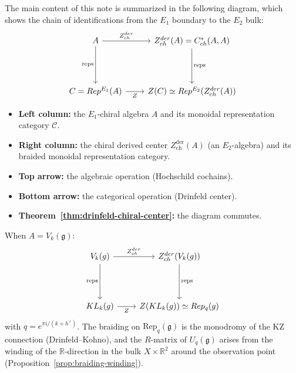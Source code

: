 \documentclass[11pt]{article}
\theoremstyle{definition}
\theoremstyle{remark}
\newcommand{\Rep}{\mathrm{Rep}}
\newcommand{\Uq}{U_q}
\newcommand{\cC}{\mathcal{C}}
\newcommand{\cZ}{\mathcal{Z}}
\newcommand{\frakg}{\mathfrak{g}}
\newcommand{\KL}{\mathrm{KL}}
\newcommand{\Zder}{Z^{\mathrm{der}}_{\mathrm{ch}}}
\begin{document}
The main content of this note is summarized in the following diagram, which shows the chain of identifications from the $E_1$ boundary to the $E_2$ bulk:
\[
\begin{tikzcd}[row sep=1.5cm, column sep=0.8cm]
 A \ar[d, "\text{reps}"'] \ar[r, "\Zder"] &
 \Zder(A) = C^*_{\mathrm{ch}}(A,A) \ar[d, "\text{reps}"] \\
 \cC = \Rep^{E_1}(A) \ar[r, "\cZ"'] &
 \cZ(\cC) \simeq \Rep^{E_2}(\Zder(A))
\end{tikzcd}
\]
\begin{itemize}
 \item \textbf{Left column:} the $E_1$-chiral algebra $A$ and its monoidal representation category $\cC$.
 \item \textbf{Right column:} the chiral derived center $\Zder(A)$ (an $E_2$-algebra) and its braided monoidal representation category.
 \item \textbf{Top arrow:} the algebraic operation (Hochschild cochains).
 \item \textbf{Bottom arrow:} the categorical operation (Drinfeld center).
 \item \textbf{Theorem~\ref{thm:drinfeld-chiral-center}:} the diagram commutes.
\end{itemize}

When $A = V_k(\frakg)$:
\[
\begin{tikzcd}[row sep=1.5cm, column sep=0.8cm]
 V_k(\frakg) \ar[d, "\text{reps}"'] \ar[r, "\Zder"] &
 \Zder(V_k(\frakg)) \ar[d, "\text{reps}"] \\
 \KL_k(\frakg) \ar[r, "\cZ"'] &
 \cZ(\KL_k(\frakg)) \simeq \Rep_q(\frakg)
\end{tikzcd}
\]
with $q = e^{\pi i/(k + h^\vee)}$. The braiding on $\Rep_q(\frakg)$ is the monodromy of the KZ connection (Drinfeld--Kohno), and the $R$-matrix of $\Uq(\frakg)$ arises from the winding of the $\mathbb{R}$-direction in the bulk $X \times \mathbb{R}^2$ around the observation point (Proposition~\ref{prop:braiding-winding}).
\end{document}
